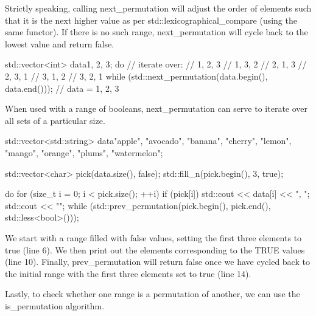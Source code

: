 
Strictly speaking, calling next\_permutation will adjust the order of elements such that it is the next higher value as per std::lexicographical\_compare (using the same functor). If there is no such range, next\_permutation will cycle back to the lowest value and return false.

\begin{box-note}
\begin{cppcode}
std::vector<int> data{1, 2, 3};
do {
    // iterate over:
    // 1, 2, 3
    // 1, 3, 2
    // 2, 1, 3
    // 2, 3, 1
    // 3, 1, 2
    // 3, 2, 1
} while (std::next_permutation(data.begin(), data.end()));
// data = {1, 2, 3}
\end{cppcode}
\end{box-note}

When used with a range of booleans, next\_permutation can serve to iterate over all sets of a particular size.

\begin{box-note}
\begin{cppcode}
std::vector<std::string> data{"apple", "avocado", "banana", 
  "cherry", "lemon", "mango", 
  "orange", "plums", "watermelon"};

std::vector<char> pick(data.size(), false);
std::fill_n(pick.begin(), 3, true);

do {
    for (size_t i = 0; i < pick.size(); ++i) {
        if (pick[i])
            std::cout << data[i] << ", ";
    }
    std::cout << "\n";
} while (std::prev_permutation(pick.begin(), pick.end(), std::less<bool>()));
\end{cppcode}
\end{box-note}

We start with a range filled with false values, setting the first three elements to true (line 6). We then print out the elements corresponding to the TRUE values (line 10). Finally, prev\_permutation will return false once we have cycled back to the initial range with the first three elements set to true (line 14).

Lastly, to check whether one range is a permutation of another, we can use the is\_permutation algorithm.



